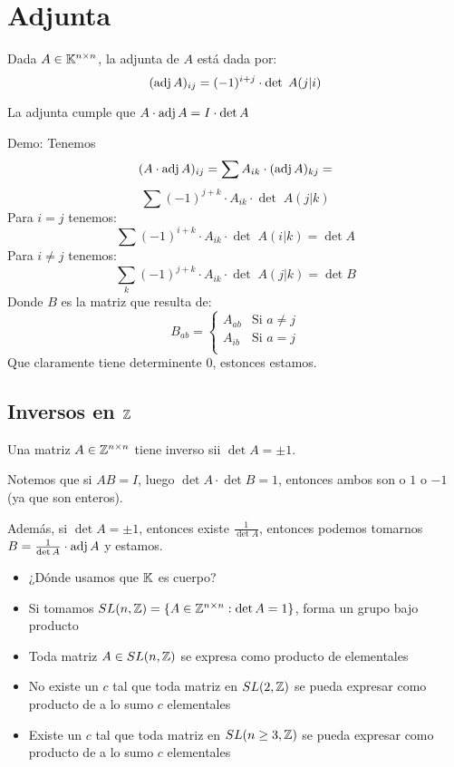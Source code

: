 \documentclass{article}
\begin{document}
\section*{Adjunta}
Dada $A \in \mathbb{K}^{n \times n}$, la adjunta de $A$ está dada por:
\[(\operatorname{adj} A)_{ij} = (-1)^{i+j} \cdot \det \; A(j|i)\]

La adjunta cumple que $A \cdot \operatorname{adj} A = I \cdot \det A$

Demo: Tenemos
\[(A \cdot \operatorname{adj} A)_{ij} = \sum A_{ik} \cdot (\operatorname{adj} A)_{kj} = \]
\[\sum (-1)^{j+k} \cdot A_{ik} \cdot \det \; A(j|k)\]
Para $i = j$ tenemos:
\[\sum (-1)^{i+k} \cdot A_{ik} \cdot \det \; A(i|k) = \det A\]
Para $i \neq j$ tenemos:
\[\sum_k (-1)^{j+k} \cdot A_{ik} \cdot \det \; A(j|k) = \det B\]
Donde $B$ es la matriz que resulta de:
\[
	B_{ab} = 
	\begin{cases}
		A_{ab} & \text{Si $a \neq j$} \\
		A_{ib} & \text{Si $a = j$} \\
	\end{cases}
\]
Que claramente tiene determinente $0$, estonces estamos.
\subsection*{Inversos en $\mathbb{Z}$}
Una matriz $A \in \mathbb{Z}^{n \times n}$ tiene inverso sii $\det A = \pm 1$.

Notemos que si $AB = I$, luego $\det A \cdot \det B = 1$, entonces ambos son o $1$ o $-1$ (ya que son enteros).

Además, si $\det A = \pm 1$, entonces existe $\frac{1}{\det A}$, entonces podemos tomarnos $B = \frac{1}{\det A} \cdot \operatorname{adj} A$ y estamos.

\begin{itemize}
	\item ¿Dónde usamos que $\mathbb{K}$ es cuerpo?
	\item Si tomamos $SL(n,\mathbb{Z}) = \{ A \in \mathbb{Z}^{n \times n} : \det A = 1 \}$, forma un grupo bajo producto
	\item Toda matriz $A \in SL(n, \mathbb{Z})$ se expresa como producto de elementales
	\item No existe un $c$ tal que toda matriz en $SL(2, \mathbb{Z})$ se pueda expresar como producto de a lo sumo $c$ elementales
	\item Existe un $c$ tal que toda matriz en $SL(n \geq 3, \mathbb{Z})$ se pueda expresar como producto de a lo sumo $c$ elementales
\end{itemize}
\end{document}
